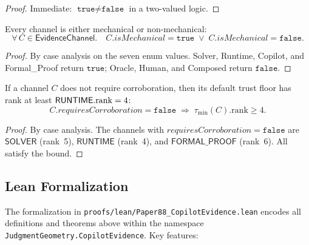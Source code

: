 \documentclass[11pt]{article}
\newcommand{\EvCh}{\mathsf{EvidenceChannel}}
\begin{document}
\begin{proof}
Immediate: $\texttt{true} \neq \texttt{false}$ in a
two-valued logic.
\end{proof}

\begin{proposition}
\label{prop:complete}
Every channel is either mechanical or non-mechanical:
\[
  \forall\, C \in \EvCh.\quad
  C.\mathit{isMechanical} = \texttt{true}
  \;\lor\; C.\mathit{isMechanical} = \texttt{false}.
\]
\end{proposition}

\begin{proof}
By case analysis on the seven enum values.  Solver, Runtime,
Copilot, and Formal\_Proof return $\texttt{true}$; Oracle,
Human, and Composed return $\texttt{false}$.
\end{proof}

\begin{proposition}
\label{prop:strong-no-corrob}
If a channel $C$ does not require corroboration, then its
default trust floor has rank at least
$\mathsf{RUNTIME}.\mathrm{rank} = 4$:
\[
  C.\mathit{requiresCorroboration} = \texttt{false}
  \;\Longrightarrow\;
  \tau_{\min}(C).\mathrm{rank} \geq 4.
\]
\end{proposition}

\begin{proof}
By case analysis.  The channels with
$\mathit{requiresCorroboration} = \texttt{false}$ are
$\mathsf{SOLVER}$ (rank~5), $\mathsf{RUNTIME}$ (rank~4),
and $\mathsf{FORMAL\_PROOF}$ (rank~6).  All satisfy the bound.
\end{proof}

\subsection{Lean Formalization}
\label{sec:formal:lean}

The \LEAN{} formalization in
\texttt{proofs/lean/Paper88\_CopilotEvidence.lean} encodes
all definitions and theorems above within the namespace
\texttt{JudgmentGeometry.CopilotEvidence}.  Key features:
\end{document}
